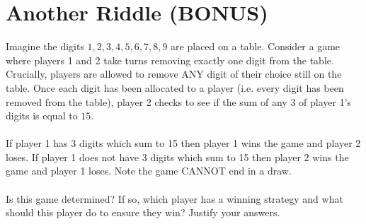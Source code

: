 \documentclass[11pt]{article}
\theoremstyle{definition}
\theoremstyle{plain}
\begin{document}
\section{Another Riddle (BONUS)}
Imagine the digits $1,2,3,4,5,6,7,8,9$ are placed on a table. Consider a game where players 1 and 2 take turns removing exactly one digit from the table. Crucially, players are allowed to remove ANY digit of their choice still on the table. Once each digit has been allocated to a player (i.e. every digit has been removed from the table), player 2 checks to see if the sum of any $3$ of player 1's digits is equal to $15$. 
\\
\\
If player 1 has $3$ digits which sum to 15 then player 1 wins the game and player 2 loses. If player 1 does not have $3$ digits which sum to 15 then player 2 wins the game and player 1 loses. Note the game CANNOT end in a draw.
\\
\\
Is this game determined? If so, which player has a winning strategy and what should this player do to ensure they win? Justify your answers.
\end{document}
